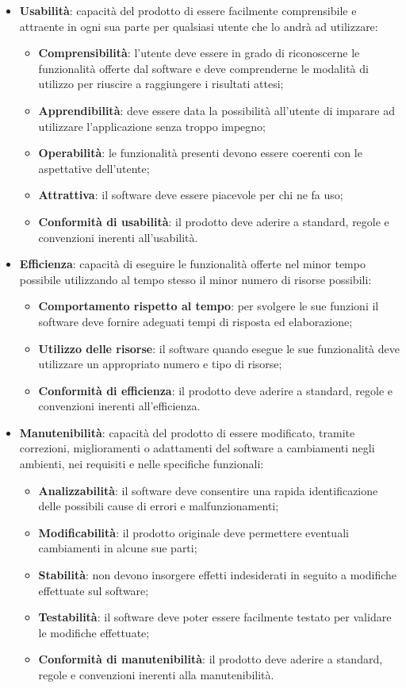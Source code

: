 \begin{itemize}
	\item\textbf{Usabilità}: capacità del prodotto di essere facilmente comprensibile e attraente in ogni sua parte per qualsiasi utente che lo andrà ad utilizzare:
	\begin{itemize}
		\item\textbf{Comprensibilità}: l'utente deve essere in grado di riconoscerne le funzionalità offerte dal software e deve comprenderne le modalità di utilizzo per riuscire a raggiungere i risultati attesi;
		\item\textbf{Apprendibilità}: deve essere data la possibilità all'utente di imparare ad utilizzare l'applicazione senza troppo impegno;
		\item\textbf{Operabilità}: le funzionalità presenti devono essere coerenti con le aspettative dell'utente;
		\item\textbf{Attrattiva}: il software deve essere piacevole per chi ne fa uso;
		\item\textbf{Conformità di usabilità}: il prodotto deve aderire a standard, regole e convenzioni inerenti all'usabilità.
	\end{itemize}

	\item\textbf{Efficienza}: capacità di eseguire le funzionalità offerte nel minor tempo possibile utilizzando al tempo stesso il minor numero di risorse possibili:
	\begin{itemize}
		\item\textbf{Comportamento rispetto al tempo}: per svolgere le sue funzioni il software deve fornire adeguati tempi di risposta ed elaborazione;
		\item\textbf{Utilizzo delle risorse}: il software quando esegue le sue funzionalità deve utilizzare un appropriato numero e tipo di risorse;
		\item\textbf{Conformità di efficienza}: il prodotto deve aderire a standard, regole e convenzioni inerenti all'efficienza.
	\end{itemize}

	\item\textbf{Manutenibilità}: capacità del prodotto di essere modificato, tramite correzioni, miglioramenti o adattamenti del software a cambiamenti negli ambienti, nei requisiti e nelle specifiche funzionali:
	\begin{itemize}
		\item\textbf{Analizzabilità}: il software deve consentire una rapida identificazione delle possibili cause di errori e malfunzionamenti;
		\item\textbf{Modificabilità}: il prodotto originale deve permettere eventuali cambiamenti in alcune sue parti;
		\item\textbf{Stabilità}: non devono insorgere effetti indesiderati in seguito a modifiche effettuate sul software;
		\item\textbf{Testabilità}: il software deve poter essere facilmente testato per validare le modifiche effettuate;
		\item\textbf{Conformità di manutenibilità}: il prodotto deve aderire a standard, regole e convenzioni inerenti alla manutenibilità.
	\end{itemize}


\end{itemize}
